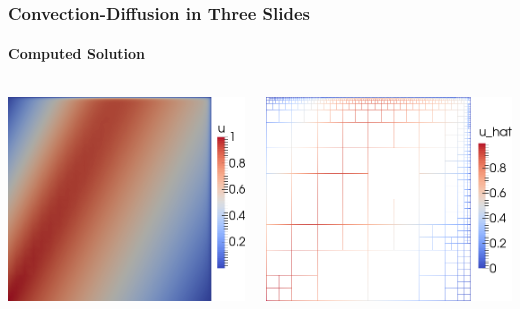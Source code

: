 \documentclass[18pt,xcolor=table]{beamer}
\begin{document}
\begin{frame}[fragile]
\frametitle{Convection-Diffusion in Three Slides}
\framesubtitle{Computed Solution}  %
\begin{columns}[t]
\begin{column}{.5\textwidth}
\includegraphics[height=0.55\textheight]{Confusion/Tutorial/u_ref9.png}
\end{column}
\begin{column}{.5\textwidth}
\includegraphics[height=0.55\textheight]{Confusion/Tutorial/uhat_ref9.png}
\end{column}
\end{columns}
\end{frame}
\end{document}
